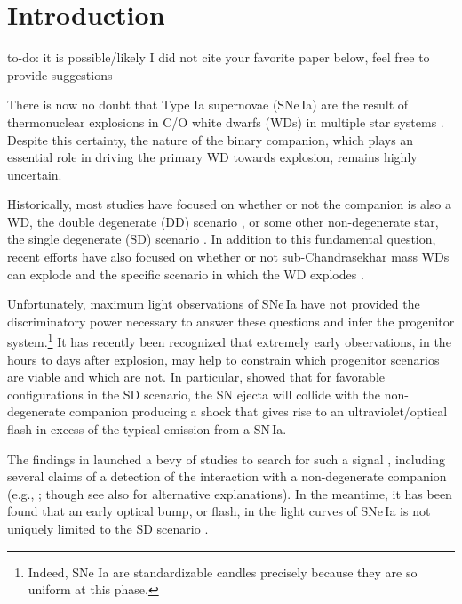 \documentclass[twocolumn]{aastex63}
\newcommand{\todo}[1]{{\color{magenta} to-do: {#1}}}
\begin{document}
\keywords{}

\section{Introduction} \label{sec:intro}

\todo{it is possible/likely I did not cite your favorite paper below, feel
free to provide suggestions}

There is now no doubt that Type Ia supernovae (SNe\,Ia) are the result of
thermonuclear explosions in C/O white dwarfs (WDs) in multiple star systems
\citep[see e.g.,][and references therein]{Maoz14}. Despite this certainty, the
nature of the binary companion, which plays an essential role in driving the
primary WD towards explosion, remains highly uncertain.

Historically, most studies have focused on whether or not the companion is
also a WD, the double degenerate (DD) scenario \citep[e.g.,][]{Webbink84}, or
some other non-degenerate star, the single degenerate (SD) scenario
\citep[e.g.,][]{Whelan73}. In addition to this fundamental question, recent
efforts have also focused on whether or not sub-Chandrasekhar mass WDs can
explode \citep[e.g.,][]{Fink10,Shen14,Scalzo14a,Polin19} and the specific
scenario in which the WD explodes \citep[see][and references
therein]{Hillebrandt13,Ropke18}.

Unfortunately, maximum light observations of SNe\,Ia have not provided the
discriminatory power necessary to answer these questions and infer the
progenitor system.\footnote{Indeed, SNe Ia are standardizable candles
precisely because they are so uniform at this phase.} It has recently been
recognized that extremely early observations, in the hours to days after
explosion, may help to constrain which progenitor scenarios are viable and
which are not. In particular, \citet{Kasen10a} showed that for favorable
configurations in the SD scenario, the SN ejecta will collide with the
non-degenerate companion producing a shock that gives rise to an
ultraviolet/optical flash in excess of the typical emission from a SN\,Ia.

The findings in \citet{Kasen10a} launched a bevy of studies to search for
such a signal \citep[e.g.,][]{Hayden10,Ganeshalingam11,Bianco11,Olling15},
including several claims of a detection of the interaction with a
non-degenerate companion (e.g.,
\citealt{Cao15,Marion16,Hosseinzadeh17,Dimitriadis19}; though see also
\citealt{Kromer16,Shappee16a,Shappee19} for alternative explanations). In the
meantime, it has been found that an early optical bump, or flash, in the light
curves of SNe\,Ia is not uniquely limited to the SD scenario
\citep[e.g.,][]{Raskin13,Piro16,Levanon17,Noebauer17,Polin19,Magee20a}.
\end{document}
